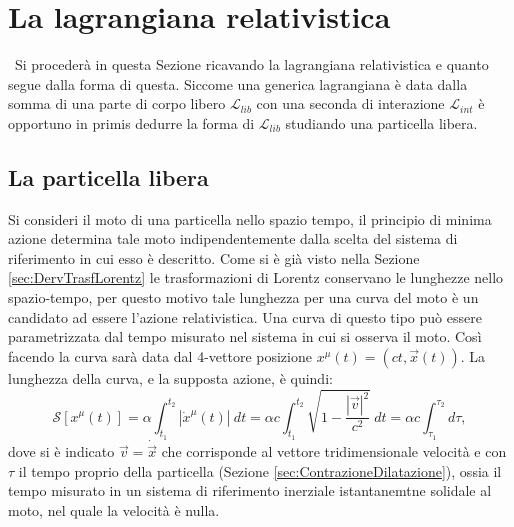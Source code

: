 \section{La lagrangiana relativistica}\
Si procederà in questa Sezione ricavando la lagrangiana relativistica e quanto segue dalla forma di questa. Siccome una generica lagrangiana è data dalla somma di una parte di corpo libero $\mathcal{L}_{lib}$ con una seconda di interazione $\mathcal{L}_{int}$ è opportuno in primis dedurre la forma di $\mathcal{L}_{lib}$ studiando una particella libera.
\subsection{La particella libera}
Si consideri il moto di una particella nello spazio tempo, il principio di minima azione determina tale moto indipendentemente dalla scelta del sistema di riferimento in cui esso è descritto.
Come si è già visto nella Sezione \ref{sec:DervTrasfLorentz} le trasformazioni di Lorentz conservano le lunghezze nello spazio-tempo, per questo motivo tale lunghezza per una curva del moto è un candidato ad essere l'azione relativistica. Una curva di questo tipo può essere parametrizzata dal tempo misurato nel sistema in cui si osserva il moto. Così facendo la curva sarà data dal 4-vettore posizione $x^\mu(t)=(ct,\vec{x}(t))$. La lunghezza della curva, e la supposta azione, è quindi:
\begin{equation}
    \label{azioneRel}
    \mathcal{S}[x^\mu(t)]=\alpha\int_{t_1}^{t_2} |\dot{x}^\mu(t)|\ dt= \alpha c\int_{t_1}^{t_2} \sqrt{1-\frac{|\vec{v}|^2}{c^2}}\ dt=\alpha c\int_{\tau_1}^{\tau_2}d\tau,
\end{equation}
dove si è indicato $\vec{v}=\dot{\vec{x}}$ che corrisponde al vettore tridimensionale velocità e con $\tau$ il tempo proprio della particella (Sezione \ref{sec:ContrazioneDilatazione}), ossia il tempo misurato in un sistema di riferimento inerziale istantanemtne solidale al moto, nel quale la velocità è nulla.\\

